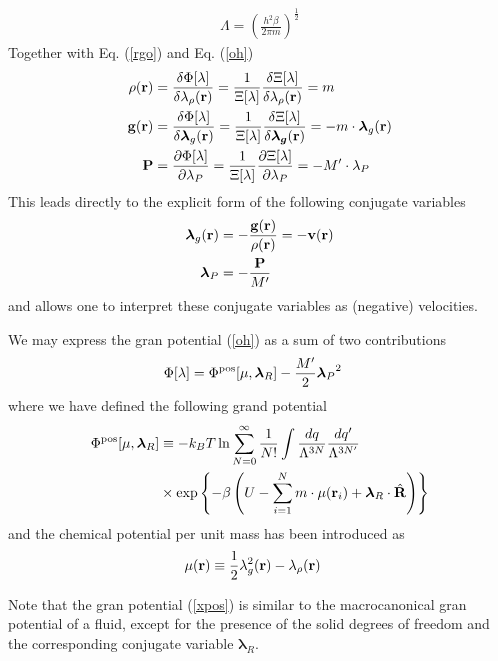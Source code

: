 \documentclass[a4paper,openright,12pt]{book}
\begin{document}
\begin{align}
\Lambda=\left(\frac{h^2\beta}{2\pi m}\right)^{\frac{1}{2}}
\end{align}
Together with Eq. (\ref{rgo}) and Eq. (\ref{oh})
\begin{align}
  \rho({\bf r}) &=\frac{\delta \Phi [\lambda]}{\delta \lambda_\rho({\bf r}) } = \frac{1}{\Xi[\lambda]} \frac{\delta\Xi [\lambda]}{\delta \lambda_{\rho}({\bf r})} = m
  \nonumber\\
  {\bf g}({\bf r}) &=\frac{\delta \Phi [\lambda]}{\delta \boldsymbol{\lambda}_g({\bf r}) } =\frac{1}{\Xi[\lambda]} \frac{\delta\Xi [\lambda]}{\delta \boldsymbol{\lambda_g}({\bf r})} = -m\cdot\boldsymbol{\lambda}_g({\bf r})
 \nonumber\\
  {\bf P} &=\frac{\partial \Phi [\lambda]}{\partial \lambda_P} =\frac{1}{\Xi[\lambda]} \frac{\partial\Xi [\lambda]}{\partial \lambda_P} = -M'\cdot\lambda_P
\end{align}
This leads directly to the explicit form of the following conjugate variables
\begin{align}
 \boldsymbol{\lambda}_g({\bf r}) &= -\frac{{\bf g}({\bf r})}{\rho({\bf r})}=-{\bf v}({\bf r})
\nonumber\\
 \boldsymbol{\lambda}_P &= -\frac{{\bf P}}{M'}
\label{nu}
\end{align}
and allows  one to interpret  these conjugate variables  as (negative)
velocities.  


We may express the gran potential (\ref{oh}) as a sum of two contributions
\begin{align}
\Phi [\lambda]&=  \Phi^{\rm pos}[\mu,\boldsymbol{\lambda}_R]
-\frac{M'}{2} {\boldsymbol{\lambda}_P}^2
\end{align}
where we have defined the following grand potential
\begin{align}
\Phi^{\rm pos}[\mu,\boldsymbol{\lambda}_R]
&\equiv-k_BT\ln
 \sum_{N=0}^\infty \frac{1}{N!}
\int \frac{dq}{\Lambda^{3N}}\frac{dq'}{\Lambda^{3N'}}\nonumber\\
&\times
\exp\left\{-\beta  \left(U-\sum_{i=1}^N m\cdot\mu({\bf
    r}_i)+ \boldsymbol{\lambda}_R\cdot\hat{\bf R}\right)\right\}
\label{xpos}
\end{align}
and the chemical potential per unit mass has been introduced as
\begin{align}
  \mu({\bf r})&\equiv\frac{1}{2}\lambda_g^2({\bf r})-\lambda_\rho({\bf r})
\label{chempot}
\end{align}

Note that the gran potential (\ref{xpos}) is similar to the macrocanonical gran potential of a fluid, except for the presence of the solid degrees of freedom and the corresponding conjugate variable $\boldsymbol{\lambda}_R$. 
\end{document}
